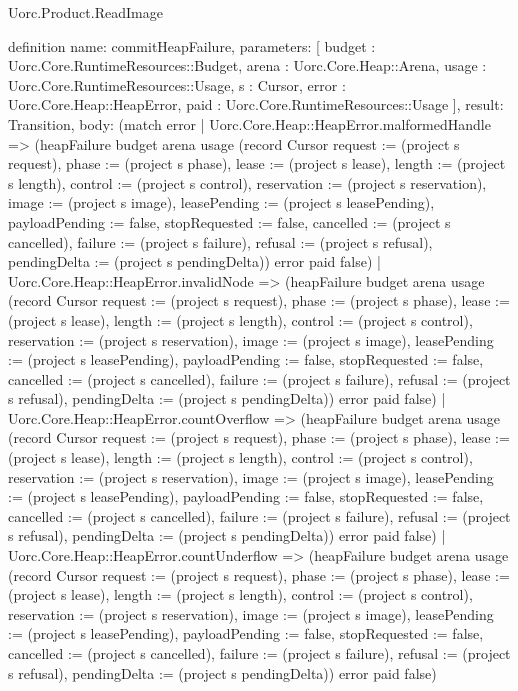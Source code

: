 \begin{lexlean}{Uorc.Product.ReadImage}
\begin{semanticmodule}
definition{
  name: commitHeapFailure,
  parameters: [
    budget : Uorc.Core.RuntimeResources::Budget,
    arena : Uorc.Core.Heap::Arena,
    usage : Uorc.Core.RuntimeResources::Usage,
    s : Cursor,
    error : Uorc.Core.Heap::HeapError,
    paid : Uorc.Core.RuntimeResources::Usage
  ],
  result: Transition,
  body: (match error
    | Uorc.Core.Heap::HeapError.malformedHandle => (heapFailure budget arena usage (record Cursor {request := (project s request), phase := (project s phase), lease := (project s lease), length := (project s length), control := (project s control), reservation := (project s reservation), image := (project s image), leasePending := (project s leasePending), payloadPending := false, stopRequested := false, cancelled := (project s cancelled), failure := (project s failure), refusal := (project s refusal), pendingDelta := (project s pendingDelta)}) error paid false)
    | Uorc.Core.Heap::HeapError.invalidNode => (heapFailure budget arena usage (record Cursor {request := (project s request), phase := (project s phase), lease := (project s lease), length := (project s length), control := (project s control), reservation := (project s reservation), image := (project s image), leasePending := (project s leasePending), payloadPending := false, stopRequested := false, cancelled := (project s cancelled), failure := (project s failure), refusal := (project s refusal), pendingDelta := (project s pendingDelta)}) error paid false)
    | Uorc.Core.Heap::HeapError.countOverflow => (heapFailure budget arena usage (record Cursor {request := (project s request), phase := (project s phase), lease := (project s lease), length := (project s length), control := (project s control), reservation := (project s reservation), image := (project s image), leasePending := (project s leasePending), payloadPending := false, stopRequested := false, cancelled := (project s cancelled), failure := (project s failure), refusal := (project s refusal), pendingDelta := (project s pendingDelta)}) error paid false)
    | Uorc.Core.Heap::HeapError.countUnderflow => (heapFailure budget arena usage (record Cursor {request := (project s request), phase := (project s phase), lease := (project s lease), length := (project s length), control := (project s control), reservation := (project s reservation), image := (project s image), leasePending := (project s leasePending), payloadPending := false, stopRequested := false, cancelled := (project s cancelled), failure := (project s failure), refusal := (project s refusal), pendingDelta := (project s pendingDelta)}) error paid false)
}
\end{semanticmodule}
\end{lexlean}
